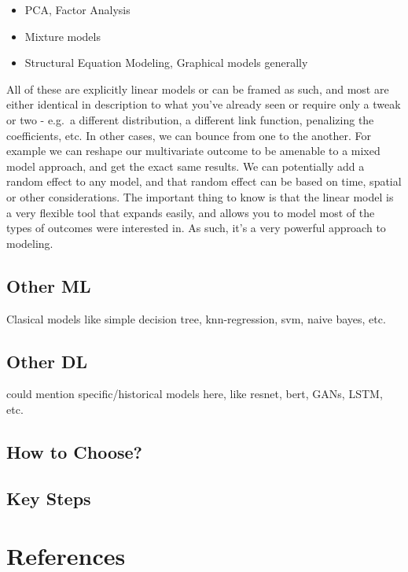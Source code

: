 \documentclass[
  letterpaper,
]{krantz}
\providecommand{\tightlist}{%
  \setlength{\itemsep}{0pt}\setlength{\parskip}{0pt}}\usepackage{longtable,booktabs,array}
\begin{document}
\begin{itemize}
\tightlist
\item
  PCA, Factor Analysis
\item
  Mixture models
\item
  Structural Equation Modeling, Graphical models generally
\end{itemize}

All of these are explicitly linear models or can be framed as such, and
most are either identical in description to what you've already seen or
require only a tweak or two - e.g.~a different distribution, a different
link function, penalizing the coefficients, etc. In other cases, we can
bounce from one to the another. For example we can reshape our
multivariate outcome to be amenable to a mixed model approach, and get
the exact same results. We can potentially add a random effect to any
model, and that random effect can be based on time, spatial or other
considerations. The important thing to know is that the linear model is
a very flexible tool that expands easily, and allows you to model most
of the types of outcomes were interested in. As such, it's a very
powerful approach to modeling.

\section{Other ML}\label{other-ml}

Clasical models like simple decision tree, knn-regression, svm, naive
bayes, etc.

\section{Other DL}\label{other-dl}

could mention specific/historical models here, like resnet, bert, GANs,
LSTM, etc.

\section{How to Choose?}\label{how-to-choose}

\section{Key Steps}\label{key-steps}

\cleardoublepage
{}
{}
\appendix

\chapter{References}\label{references}
\end{document}
